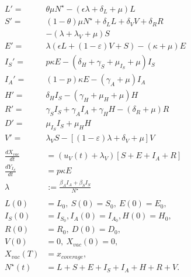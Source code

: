 \begin{equation}
    \label{eqn:vacination_dynamics}
    \begin{aligned}
        L' =&  \theta \mu N^{\star}
                -(\epsilon \lambda + \delta_L + \mu) L
        \\
        S' =&
        	(1 - \theta) \mu N^\star
            + \delta_L L
            + \delta_V V
            + \delta_R R
        	\\
            &-
            \left(
            	\lambda + \lambda_V + \mu
            \right) S
        \\
        E' =&
                \lambda (\epsilon L + (1-\varepsilon) V + S)
                - (\kappa + \mu) E
        \\
        I_S' =&
        	p \kappa E
            -
            (
            	\delta_H +
            	\gamma_S +
                \mu_{I_S} +
                \mu
            ) I_S
        \\
        I_A' = &
                (1 - p) \kappa E - (\gamma_A + \mu) I_A
        \\
        H' = &
        		\delta_H I_S - (\gamma_H + \mu_H + \mu) H
        \\
        R' = &
            	\gamma_S I_S +
                \gamma_A I_A +
                \gamma_H H
                - (\delta_R + \mu) R
        \\
        D'  = &
                \mu_{I_S} I_S + \mu_H H
        \\
        V' = &
            \lambda_V  S
            - \left[
            	(1 - \varepsilon) \lambda
                + \delta_V
                + \mu
            \right ] V
        \\
        \\
            \frac{dX_{vac}}{dt}
            	&=
            	(u_V(t) + \lambda_V)
            	\left[
            		S + E + I_A + R
            	\right]
        \\
            \frac{d Y_{I_S}}{dt}
            	& = p \kappa E
        \\
            \lambda &:=
                \frac{\beta_A I_A + \beta_S I_S}{N^{\star}}
        \\
        \\
            L(0) &= L_0,
            \ S(0) = S_0,
            \ E(0) = E_0,
        \\
            I_S(0) &= I_{S_{0}},
            I_A(0) = I_{A_{0}},
            H(0) = H_0,
        \\
            R(0) &= R_0, \ D(0) = D_0,
      \\
            V(0) &= 0, \ X_{vac}(0) = 0, \quad
      \\
            X_{vac}(T) &= x_{coverage},
      \\
            N^{\star}(t) &=
                L + S +E + I_S + I_A +
                H + R + V .
        \end{aligned}
\end{equation}
